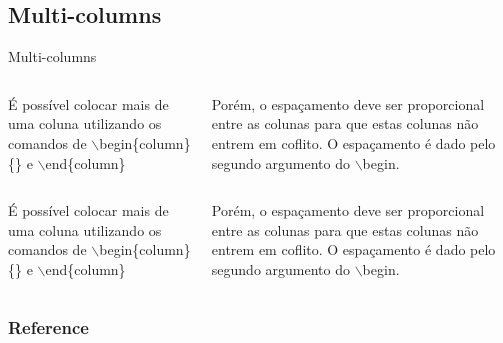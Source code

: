 \documentclass{libs/XJTLU_format}
\begin{document}
\subsection{Multi-columns}
\begin{frame}{Multi-columns}
    \begin{columns}{}
        \begin{column}{0.5\textwidth}
            \justify
            É possível colocar mais de uma coluna utilizando os comandos de $\backslash$begin\{column\}\{\} e $\backslash$end\{column\}
        \end{column}
        \begin{column}{0.5\textwidth}
            \justify
            Porém, o espaçamento deve ser proporcional entre as colunas para que estas colunas não entrem em coflito. O espaçamento é dado pelo segundo argumento do $\backslash$begin.
        \end{column}
    \end{columns}   
    \begin{columns}{}
        \begin{column}{0.5\textwidth}
            \justify
            É possível colocar mais de uma coluna utilizando os comandos de $\backslash$begin\{column\}\{\} e $\backslash$end\{column\}
        \end{column}
        \begin{column}{0.5\textwidth}
            \justify
            Porém, o espaçamento deve ser proporcional entre as colunas para que estas colunas não entrem em coflito. O espaçamento é dado pelo segundo argumento do $\backslash$begin.
        \end{column}
    \end{columns}     
\end{frame}


\begin{frame}[allowframebreaks]
    \frametitle{Reference}
    \printbibliography
\end{frame}

\begin{frame}{}
    \centering
    \huge{\textbf{}}
    
    
\end{frame}
\end{document}
